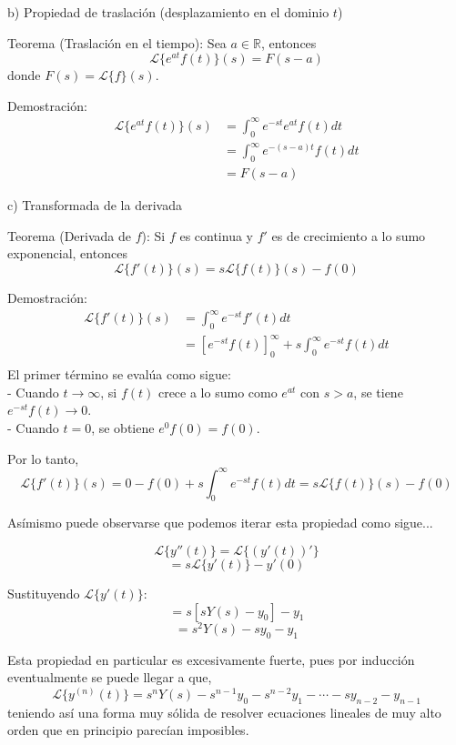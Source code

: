 \documentclass{article}
\theoremstyle{nonumberplain}
\begin{document}
 b) Propiedad de traslación (desplazamiento en el dominio \( t \))

Teorema (Traslación en el tiempo):  
Sea \( a \in \mathbb{R} \), entonces
\[
\mathcal{L}\{e^{a t} f(t)\}(s) = F(s - a)
\]
donde \( F(s) = \mathcal{L}\{f\}(s) \).

Demostración:
\[
\begin{align}
\mathcal{L}\{e^{a t} f(t)\}(s) &= \int_0^{\infty} e^{-s t} e^{a t} f(t) dt \\
&= \int_0^{\infty} e^{-(s - a) t} f(t) dt \\
&= F(s - a)
\end{align}
\]



 c) Transformada de la derivada

Teorema (Derivada de \( f \)):
Si \( f \) es continua y \( f' \) es de crecimiento a lo sumo exponencial, entonces
\[
\mathcal{L}\{f'(t)\}(s) = s \mathcal{L}\{f(t)\}(s) - f(0)
\]

Demostración:
\[
\begin{align}
\mathcal{L}\{f'(t)\}(s) &= \int_{0}^{\infty} e^{-s t} f'(t) dt \\
&= \left[ e^{-s t} f(t) \right]_{0}^{\infty} + s \int_{0}^{\infty} e^{-s t} f(t) dt \\
\end{align}
\]
El primer término se evalúa como sigue:  \\
- Cuando \( t \to \infty \), si \( f(t) \) crece a lo sumo como \( e^{a t} \) con \( s > a \), se tiene \( e^{-s t} f(t) \to 0 \).\\
- Cuando \( t = 0 \), se obtiene \( e^{0} f(0) = f(0) \).

Por lo tanto,
\[
\mathcal{L}\{f'(t)\}(s) = 0 - f(0) + s \int_{0}^{\infty} e^{-s t} f(t) dt = s \mathcal{L}\{f(t)\}(s) - f(0)
\]

Asímismo puede observarse que podemos iterar esta propiedad como sigue...

\[
\mathcal{L}\{y''(t)\} = \mathcal{L}\{(y'(t))'\}
\]
\[
= s \mathcal{L}\{y'(t)\} - y'(0)
\]

Sustituyendo \(\mathcal{L}\{y'(t)\}\):
\[
= s [s Y(s) - y_0] - y_1
\]
\[
= s^2 Y(s) - s y_0 - y_1
\]

Esta propiedad en particular es excesivamente fuerte, pues por inducción eventualmente se puede llegar a que,
\[
\mathcal{L}\{y^{(n)}(t)\} = s^n Y(s) - s^{n-1} y_0 - s^{n-2} y_1 - \cdots - s y_{n-2} - y_{n-1}
\]
teniendo así una forma muy sólida de resolver ecuaciones lineales de muy alto orden que en principio parecían imposibles.
\end{document}
